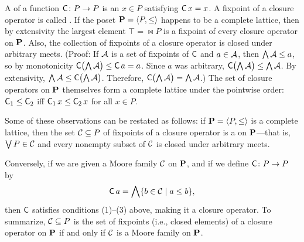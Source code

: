 A  of a
function $\operatorname{\mathsf{C}} \colon  P \to P$ is an $x\in P$ satisfying $\operatorname{\mathsf{C}} x = x$.
A fixpoint of a closure operator is called .
If the poset $\mathbf{P} = \langle P, \leq\rangle$ happens to be a complete lattice,
then by extensivity the largest element $\top = \Join P$ is
a fixpoint of every closure operator on $\mathbf{P}$.
Also, the collection of fixpoints of a closure operator is closed under arbitrary meets.
(Proof: If $\mathcal{A}$ is a set of fixpoints of $\operatorname{\mathsf{C}}$ and  
$a \in \mathcal{A}$, then $\bigwedge \mathcal{A} \leq a$, so by monotonicity
$\operatorname{\mathsf{C}} \bigl( \bigwedge \mathcal{A} \bigr) \leq \operatorname{\mathsf{C}} a = a$. 
Since $a$ was arbitrary,
$\operatorname{\mathsf{C}} \bigl( \bigwedge \mathcal{A} \bigr) \leq  \bigwedge \mathcal{A}$.
By extensivity,
$\bigwedge \mathcal{A} \leq \operatorname{\mathsf{C}} \bigl( \bigwedge \mathcal{A}\bigr)$. %
Therefore, $\operatorname{\mathsf{C}} \bigl( \bigwedge \mathcal{A} \bigr) =  \bigwedge \mathcal{A}$.)
The set of closure operators on $\mathbf{P}$
themselves form a complete lattice under the pointwise
order: $\operatorname{\mathsf{C}}_1 \leq  \operatorname{\mathsf{C}}_2$ iff $\operatorname{\mathsf{C}}_1 x \leq  \operatorname{\mathsf{C}}_2 x$ for all $x \in P$. 

Some of these observations can be restated as follows:
if $\mathbf{P} = \langle P, \leq\rangle$ is a complete lattice,
then the set $\mathcal{C} \subseteq P$ of fixpoints of a closure operator
is a  on $\mathbf{P}$---that is, 
$\bigvee P \in \mathcal{C}$ and every nonempty subset of $\mathcal{C}$ is closed under arbitrary meets.


Conversely, if we are given a Moore family $\mathcal{C}$ on $\mathbf{P}$, and if we define 
$\operatorname{\mathsf{C}} \colon P \to P$ by
\[
\operatorname{\mathsf{C}} a = \bigwedge \{b \in \mathcal{C} \mid a\leq b\},
\]
then $\operatorname{\mathsf{C}}$ satisfies conditions (1)--(3)
above, making it a closure operator.
To summarize, $\mathcal{C} \subseteq P$ is the set of fixpoints (i.e., closed elements)
of a closure operator on
$\mathbf{P}$ if and only if $\mathcal{C}$ is a Moore family on $\mathbf{P}$.

